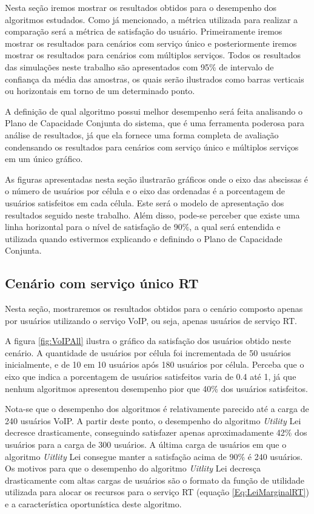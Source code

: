Nesta seção iremos mostrar os resultados obtidos para o desempenho dos algoritmos estudados. Como já mencionado, a métrica utilizada para realizar a comparação será a métrica de satisfação do usuário. Primeiramente iremos mostrar os resultados para cenários com serviço único e posteriormente iremos mostrar os resultados para cenários com múltiplos serviços. Todos os resultados das simulações neste trabalho são apresentados com 95\% de intervalo de confiança da média das amostras, os quais serão ilustrados como barras verticais ou horizontais em torno de um determinado ponto.  

A definição de qual algoritmo possui melhor desempenho será feita analisando o Plano de Capacidade Conjunta do sistema, que é uma ferramenta poderosa para análise de resultados, já que ela fornece uma forma completa de avaliação condensando os resultados para cenários com serviço único e múltiplos serviços em um único gráfico.

As figuras apresentadas nesta seção ilustrarão gráficos onde o eixo das abscissas é o número de usuários por célula e o eixo das ordenadas é a porcentagem de usuários satisfeitos em cada célula. Este será o modelo de apresentação dos resultados seguido neste trabalho. Além disso, pode-se perceber que existe uma linha horizontal para o nível de satisfação de 90\%, a qual será entendida e utilizada quando estivermos explicando e definindo o Plano de Capacidade Conjunta.

\subsection{Cenário com serviço único RT}

Nesta seção, mostraremos os resultados obtidos para o cenário composto apenas por usuários utilizando o serviço VoIP, ou seja, apenas usuários de serviço RT.

A figura \ref{fig:VoIPAll} ilustra o gráfico da satisfação dos usuários obtido neste cenário. A quantidade de usuários por célula foi incrementada de 50 usuários inicialmente, e de 10 em 10 usuários após 180 usuários por célula. Perceba que o eixo que indica a porcentagem de usuários satisfeitos varia de 0.4 até 1, já que nenhum algoritmos apresentou desempenho pior que 40\% dos usuários satisfeitos. 

Nota-se que o desempenho dos algoritmos é relativamente parecido até a carga de 240 usuários VoIP. A partir deste ponto, o desempenho do algoritmo \textit{Utility} Lei decresce drasticamente, conseguindo satisfazer apenas aproximadamente 42\% dos usuários para a carga de 300 usuários. A última carga de usuários em que o algoritmo \textit{Uitlity} Lei consegue manter a satisfação acima de 90\% é 240 usuários. Os motivos para que o desempenho do algoritmo \textit{Uitlity} Lei decresça drasticamente com altas cargas de usuários são o formato da função de utilidade utilizada para alocar os recursos para o serviço RT (equação \ref{Eq:LeiMarginalRT}) e a característica oportunística deste algoritmo. 

